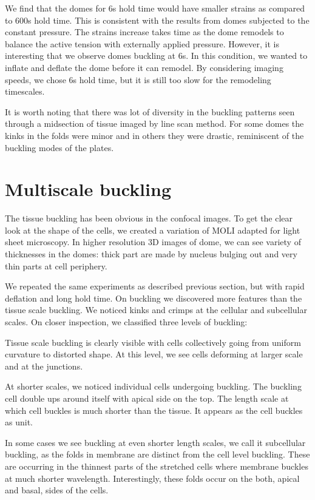 We find that the domes for 6s hold time would have smaller strains as
compared to 600s hold time. This is consistent with the results from
domes subjected to the constant pressure. The strains increase takes
time as the dome remodels to balance the active tension with externally
applied pressure. However, it is interesting that we observe domes
buckling at 6s. In this condition, we wanted to inflate and deflate the
dome before it can remodel. By considering imaging speeds, we chose 6s
hold time, but it is still too slow for the remodeling timescales.

It is worth noting that there was lot of diversity in the buckling
patterns seen through a midsection of tissue imaged by line scan method.
For some domes the kinks in the folds were minor and in others they were
drastic, reminiscent of the buckling modes of the plates.

\hypertarget{multiscale-buckling}{%
\section{Multiscale buckling}\label{multiscale-buckling}}

The tissue buckling has been obvious in the confocal images. To get the
clear look at the shape of the cells, we created a variation of MOLI
adapted for light sheet microscopy. In higher resolution 3D images of
dome, we can see variety of thicknesses in the domes: thick part are
made by nucleus bulging out and very thin parts at cell periphery.

We repeated the same experiments as described previous section, but with
rapid deflation and long hold time. On buckling we discovered more
features than the tissue scale buckling. We noticed kinks and crimps at
the cellular and subcellular scales. On closer inspection, we classified
three levels of buckling:

Tissue scale buckling is clearly visible with cells collectively going
from uniform curvature to distorted shape. At this level, we see cells
deforming at larger scale and at the junctions.

At shorter scales, we noticed individual cells undergoing buckling. The
buckling cell double ups around itself with apical side on the top. The
length scale at which cell buckles is much shorter than the tissue. It
appears as the cell buckles as unit.

In some cases we see buckling at even shorter length scales, we call it
subcellular buckling, as the folds in membrane are distinct from the
cell level buckling. These are occurring in the thinnest parts of the
stretched cells where membrane buckles at much shorter wavelength.
Interestingly, these folds occur on the both, apical and basal, sides of
the cells.

